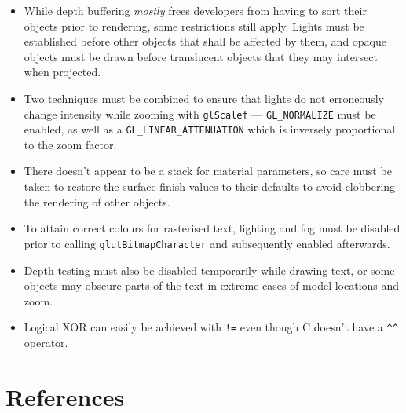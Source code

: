 \documentclass[a4paper,titlepage,12pt]{article}
\begin{document}
\begin{itemize}
	\item While depth buffering \textit{mostly} frees developers from
	      having to sort their objects prior to rendering, some
	      restrictions still apply. Lights must be established before other
	      objects that shall be affected by them, and opaque objects must
	      be drawn before translucent objects that they may intersect when
	      projected.
	\item Two techniques must be combined to ensure that lights do not
	      erroneously change intensity while zooming with \texttt{glScalef}
	      --- \texttt{GL\_NORMALIZE} must be enabled, as well as a
	      \texttt{GL\_LINEAR\_ATTENUATION} which is inversely proportional
	      to the zoom factor.
	\item There doesn't appear to be a stack for material parameters, so
	      care must be taken to restore the surface finish values to their
	      defaults to avoid clobbering the rendering of other objects.
	\item To attain correct colours for rasterised text, lighting and fog
	      must be disabled prior to calling \texttt{glutBitmapCharacter}
	      and subsequently enabled afterwards.
	\item Depth testing must also be disabled temporarily while drawing
	      text, or some objects may obscure parts of the text in extreme
	      cases of model locations and zoom.
	\item Logical XOR can easily be achieved with \texttt{!=} even though
	      C doesn't have a \texttt{\^{}\^{}} operator.
\end{itemize}

\newpage

\section{References}
\end{document}
